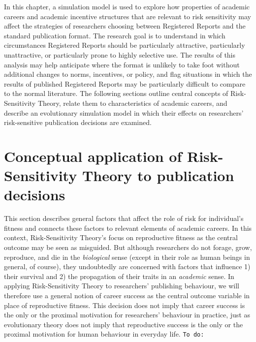 \documentclass[british,,man,mask,floatsintext]{apa6}
\begin{document}
In this chapter, a simulation model is used to explore how properties of academic careers and academic incentive structures that are relevant to risk sensitivity may affect the strategies of researchers choosing between Registered Reports and the standard publication format.
The research goal is to understand in which circumstances Registered Reports should be particularly attractive, particularly unattractive, or particularly prone to highly selective use.
The results of this analysis may help anticipate where the format is unlikely to take foot without additional changes to norms, incentives, or policy, and flag situations in which the results of published Registered Reports may be particularly difficult to compare to the normal literature.
The following sections outline central concepts of Risk-Sensitivity Theory, relate them to characteristics of academic careers, and describe an evolutionary simulation model in which their effects on researchers' risk-sensitive publication decisions are examined.

\hypertarget{conceptual-application-of-risk-sensitivity-theory-to-publication-decisions}{%
\section{Conceptual application of Risk-Sensitivity Theory to publication decisions}\label{conceptual-application-of-risk-sensitivity-theory-to-publication-decisions}}

This section describes general factors that affect the role of risk for individual's fitness and connects these factors to relevant elements of academic careers.
In this context, Risk-Sensitivity Theory's focus on reproductive fitness as the central outcome may be seen as misguided.
But although researchers do not forage, grow, reproduce, and die in the \emph{biological} sense (except in their role as human beings in general, of course), they undoubtedly are concerned with factors that influence 1) their survival and 2) the propagation of their traits in an \emph{academic} sense.
In applying Risk-Sensitivity Theory to researchers' publishing behaviour, we will therefore use a general notion of career success as the central outcome variable in place of reproductive fitness.
This decision does not imply that career success is the only or the proximal motivation for researchers' behaviour in practice, just as evolutionary theory does not imply that reproductive success is the only or the proximal motivation for human behaviour in everyday life.
\texttt{To\ do:}
\end{document}
